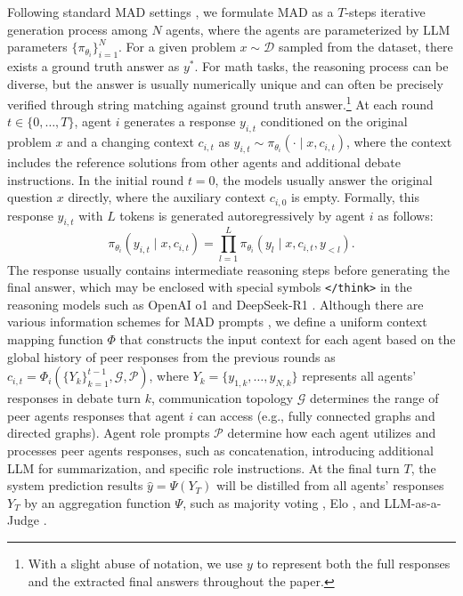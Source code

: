 \documentclass{article}
\theoremstyle{plain}
\theoremstyle{definition}
\theoremstyle{remark}
\begin{document}
Following standard MAD settings \cite{du2023improving, park2025maporl}, we formulate MAD as a $T$-steps iterative generation process among $N$ agents, where the agents are parameterized by LLM parameters $\{\pi_{\theta_i}\}_{i=1}^N$. For a given problem $x\sim\mathcal{D}$ sampled from the dataset, there exists a ground truth answer as $y^*$. For math tasks, the reasoning process can be diverse, but the answer is usually numerically unique and can often be precisely verified through string matching against ground truth answer.\footnote{With a slight abuse of notation, we use $y$ to represent both the full responses and the extracted final answers throughout the paper.}  At each round $t \in \{0, \dots, T\}$, agent $i$ generates a response $y_{i,t}$ conditioned on the original problem $x$ and a changing context $c_{i,t}$ as $y_{i,t}\sim\pi_{\theta_i}(\cdot \mid x, c_{i,t})$, where the context includes the reference solutions from other agents and additional debate instructions. In the initial round $t=0$, the models usually answer the original question $x$ directly, where the auxiliary context $c_{i,0}$ is empty. Formally, this response $y_{i,t}$ with $L$ tokens is generated autoregressively by agent $i$ as follows:
\begin{equation*}
   \pi_{\theta_i}(y_{i,t} \mid x, c_{i,t}) =  \prod_{l=1}^{L}\pi_{\theta_i}(y_l\mid x, c_{i,t}, y_{<l}).
\end{equation*}
The response usually contains intermediate reasoning steps before generating the final answer, which may be enclosed with special symbols \texttt{</think>} in the reasoning models such as OpenAI o1 and DeepSeek-R1 \cite{openai_o1, guo2025deepseek}. Although there are various information schemes for MAD prompts \cite{li2024improving, liu2024groupdebate, chen2024reconcile}, we define a uniform context mapping function $\Phi$ that constructs the input context for each agent based on the global history of peer responses from the previous rounds as $c_{i,t} = \Phi_i(\{Y_k\}_{k=1}^{t-1}, \mathcal{G}, \mathcal{P})$, where $Y_k = \{y_{1, k}, \dots, y_{N, k}\}$ represents all agents' responses in debate turn $k$, communication topology $\mathcal{G}$ determines the range of peer agents responses that agent $i$ can access (e.g., fully connected graphs and directed graphs). Agent role prompts $\mathcal{P}$ determine how each agent utilizes and processes peer agents responses, such as concatenation, introducing additional LLM for summarization, and specific role instructions.  At the final turn $T$, the system prediction results $\hat{y} = \Psi(Y_T)$ will be distilled from all agents' responses $Y_T$ by an aggregation function $\Psi$, such as majority voting \cite{du2023improving}, Elo \cite{zhang2025debate4math}, and LLM-as-a-Judge \cite{zhu2023judgelm}.
\end{document}
